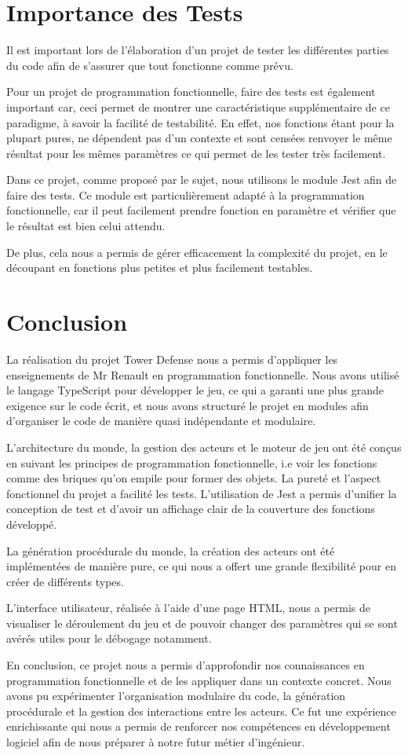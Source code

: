 \documentclass[french]{article}
\begin{document}
\newpage
\section{Importance des Tests}


Il est important lors de l'élaboration d'un projet de tester les différentes parties du code afin de s'assurer que tout fonctionne comme prévu.

Pour un projet de programmation fonctionnelle, faire des tests est également important car, ceci permet de montrer une caractéristique supplémentaire de ce paradigme, à savoir la facilité de testabilité.
En effet, nos fonctions étant pour la plupart pures, ne dépendent pas d'un contexte et sont censées renvoyer le même résultat pour les mêmes paramètres ce qui permet de les tester très facilement.

Dans ce projet, comme proposé par le sujet, nous utilisons le module Jest afin de faire des tests.
Ce module est particulièrement adapté à la programmation fonctionnelle, car il peut facilement prendre fonction en paramètre et vérifier que le résultat est bien celui attendu.

De plus, cela nous a permis de gérer efficacement la complexité du projet, en le découpant en fonctions plus petites et plus facilement testables.

\newpage

\section{Conclusion}
La réalisation du projet Tower Defense nous a permis d'appliquer les enseignements de Mr Renault en programmation fonctionnelle. Nous avons utilisé le langage TypeScript pour développer le jeu, ce qui a garanti une plus grande exigence sur le code écrit, et nous avons structuré le projet en modules afin d'organiser le code de manière quasi indépendante et modulaire.

L'architecture du monde, la gestion des acteurs et le moteur de jeu ont été conçus en suivant les principes de programmation fonctionnelle, i.e voir les fonctions comme des briques qu'on empile pour former des objets. La pureté et l'aspect fonctionnel du projet a facilité les tests. L'utilisation de Jest a permis d'unifier la conception de test et d'avoir un affichage clair de la couverture des fonctions développé. 

La génération procédurale du monde, la création des acteurs ont été implémentées de manière pure, ce qui nous a offert une grande flexibilité pour en créer de différents types.

L'interface utilisateur, réalisée à l'aide d'une page HTML, nous a permis de visualiser le déroulement du jeu et de pouvoir changer des paramètres qui se sont avérés utiles pour le débogage notamment. 

En conclusion, ce projet nous a permis d'approfondir nos connaissances en programmation fonctionnelle et de les appliquer dans un contexte concret. Nous avons pu expérimenter l'organisation modulaire du code, la génération procédurale et la gestion des interactions entre les acteurs. Ce fut une expérience enrichissante qui nous a permis de renforcer nos compétences en développement logiciel afin de nous préparer à notre futur métier d'ingénieur.
\end{document}
